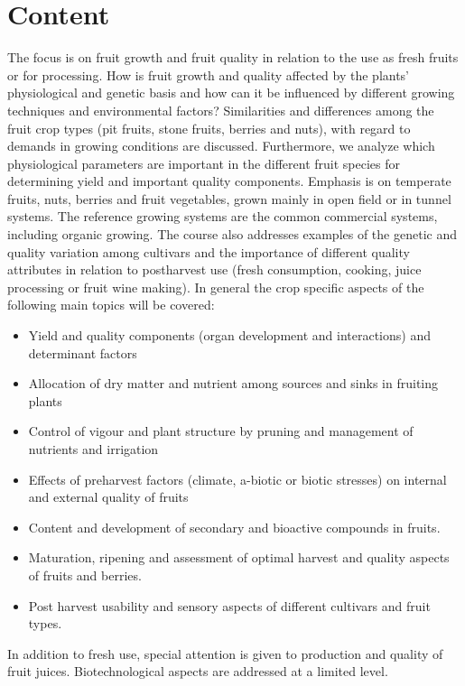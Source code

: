 \section*{Content}
The focus is on fruit growth and fruit quality in relation to the use as fresh fruits or for processing. How is fruit growth and quality affected by the plants' physiological and genetic basis and how can it be influenced by different growing techniques and environmental factors? Similarities and differences among the fruit crop types (pit fruits, stone fruits, berries and nuts), with regard to demands in growing conditions are discussed. Furthermore, we analyze which physiological parameters are important in the different fruit species for determining yield and important quality components. Emphasis is on temperate fruits, nuts, berries and fruit vegetables, grown mainly in open field or in tunnel systems. The reference growing systems are the common commercial systems, including organic growing. The course also addresses examples of the genetic and quality variation among cultivars and the importance of different quality attributes in relation to postharvest use (fresh consumption, cooking, juice processing or fruit wine making).
In general the crop specific aspects of the following main topics will be covered:
\begin{itemize}
    \item Yield and quality components (organ development and interactions) and determinant factors
    \item Allocation of dry matter and nutrient  among sources and sinks in fruiting plants
    \item Control of vigour and plant structure by pruning and management of nutrients and irrigation
    \item Effects of preharvest factors (climate, a-biotic or biotic stresses) on internal and external quality of fruits
    \item Content and development of secondary and bioactive compounds in fruits.
    \item Maturation, ripening and assessment of optimal harvest and quality aspects of fruits and berries.
    \item Post harvest usability and sensory aspects of different cultivars and fruit types.
\end{itemize}  

In addition to fresh use,  special attention is given to production and quality of fruit juices.
Biotechnological aspects are addressed at a limited level.


